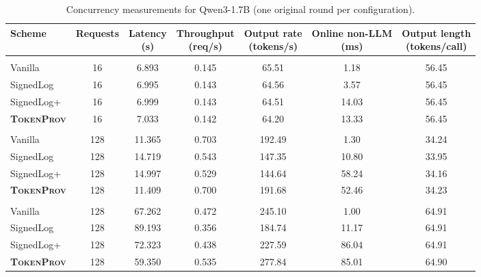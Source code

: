 \begin{table}[!t]
\centering
\caption{Concurrency measurements for Qwen3-1.7B (one original round per configuration).}
\label{tab:b3-concurrency}
\footnotesize
\renewcommand{\arraystretch}{1.10}
\begin{tabular*}{\textwidth}{@{\hspace{4pt}}l@{\extracolsep{\fill}}cccccc@{\hspace{4pt}}}
\toprule
\textbf{Scheme} & \textbf{Requests} & \shortstack{\textbf{Latency}\\\textbf{(s)}} & \shortstack{\textbf{Throughput}\\\textbf{(req/s)}} & \shortstack{\textbf{Output rate}\\\textbf{(tokens/s)}} & \shortstack{\textbf{Online non-LLM}\\\textbf{(ms)}} & \shortstack{\textbf{Output length}\\\textbf{(tokens/call)}} \\
\midrule
\rowcolor{gray!12}
\multicolumn{7}{l}{\textbf{Concurrency 1}} \\
Vanilla & 16 & 6.893 & 0.145 & 65.51 & 1.18 & 56.45 \\
SignedLog & 16 & 6.995 & 0.143 & 64.56 & 3.57 & 56.45 \\
SignedLog+ & 16 & 6.999 & 0.143 & 64.51 & 14.03 & 56.45 \\
\textbf{\textsc{TokenProv}} & 16 & 7.033 & 0.142 & 64.20 & 13.33 & 56.45 \\
\midrule
\rowcolor{gray!12}
\multicolumn{7}{l}{\textbf{Concurrency 8}} \\
Vanilla & 128 & 11.365 & 0.703 & 192.49 & 1.30 & 34.24 \\
SignedLog & 128 & 14.719 & 0.543 & 147.35 & 10.80 & 33.95 \\
SignedLog+ & 128 & 14.997 & 0.529 & 144.64 & 58.24 & 34.16 \\
\textbf{\textsc{TokenProv}} & 128 & 11.409 & 0.700 & 191.68 & 52.46 & 34.23 \\
\midrule
\rowcolor{gray!12}
\multicolumn{7}{l}{\textbf{Concurrency 32}} \\
Vanilla & 128 & 67.262 & 0.472 & 245.10 & 1.00 & 64.91 \\
SignedLog & 128 & 89.193 & 0.356 & 184.74 & 11.17 & 64.91 \\
SignedLog+ & 128 & 72.323 & 0.438 & 227.59 & 86.04 & 64.91 \\
\textbf{\textsc{TokenProv}} & 128 & 59.350 & 0.535 & 277.84 & 85.01 & 64.90 \\
\bottomrule
\end{tabular*}
\end{table}
